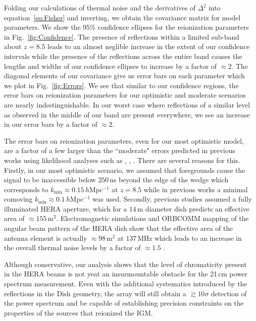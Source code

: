 \documentclass[twocolumn]{emulateapj}
\begin{document}
Folding our calculations of thermal noise and the derivatives of $\Delta^2$ into equation~\ref{eq:Fisher} and inverting, we obtain the covariance matrix for model parameters. We show the 95\% confidence ellipses for the reionization parameters in Fig.~\ref{fig:Confidence}. The presence of reflections within a limited sub-band about $z=8.5$ leads to an almost neglible increase in the extent of our confidence intervals while the presence of the reflections across the entire band causes the lengths and widths of our confidence ellipses to increase by a factor of $\approx 2$. The diagonal elements of our covariance give us error bars on each parameter which we plot in Fig.~\ref{fig:Errors}. We see that similar to our confidence regions, the error bars on reionization parameters for our optimistic and moderate scenarios are nearly indestinguishable. In our worst case where reflections of a similar level as observed in the middle of our band are present everywhere, we see an increase in our error bars by a factor of $\approx 2$. 

The error bars on reionization parameters, even for our most optimistic model, are a factor of a few larger than the ``moderate" errors predicted in previous works using likelihood analyses such as \citet{Pober:2014}, \citet{Greig:2015,Greig:2015b,Greig:2015c}  \citet{EwallWice:2015b}, \citet{Liu:2015a,Liu:2015b}. There are several reasons for this. Firstly, in our most optimistic scenario, we assumed that foregrounds cause the signal to be inaccessible below $250$\,ns beyond the edge of the wedge which corresponds to $k_\text{min} \approx 0.15$\,$h$Mpc$^{-1}$ at $z=8.5$ while in previous works a minimal comoving $k_\text{min} \approx 0.1$\,$h$Mpc$^{-1}$ was used. Secondly, previous studies assumed a fully illuminated HERA aperture, which for a $14$\,m diameter dish predicts an effective area of $\approx155$\,m$^2$. Electromagnetic simulations and ORBCOMM mapping of the angular beam pattern of the HERA dish show that the effective area of the antenna element is actually $\approx 98$\,m$^2$ at $137$\,MHz which leads to an increase in the overall thermal noise levels by a factor of $\approx 1.5$ \citep{Neben:2016}. 

Although conservative, our analysis shows that the level of chromaticity present in the HERA beams is not yeat an insurmountable obstacle for the 21\,cm power spectrum measurement. Even with the additional systematics introduced by the reflections in the Dish geometry, the array will still obtain a $\gtrsim 10 \sigma$ detection of the power spectrum and be capable of establishing precision constraints on the properties of the sources that reionized the IGM. 
\end{document}
